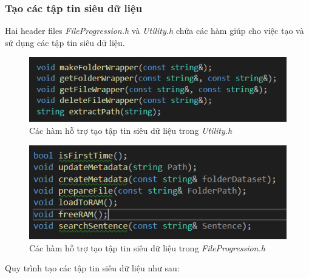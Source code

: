 \documentclass[12pt,a4paper]{article}
\begin{document}
\subsubsection{Tạo các tập tin siêu dữ liệu}
Hai header  files \textit{FileProgression.h} và \textit{Utility.h} chứa các hàm giúp cho việc tạo và sử dụng các tập tin siêu dữ liệu.
\begin{figure}[H]
\begin{center}
\includegraphics[scale=1]{Fig7}
\end{center}
\caption{Các hàm hỗ trợ tạo tập tin siêu dữ liệu trong \textit{Utility.h}}
\label{Fig7}
\end{figure}
\begin{figure}[H]
\begin{center}
\includegraphics[scale=1]{Fig8}
\end{center}
\caption{Các hàm hỗ trợ tạo tập tin siêu dữ liệu trong \textit{FileProgression.h}}
\label{Fig8}
\end{figure}
Quy trình tạo các tập tin siêu dữ liệu như sau:
\end{document}
